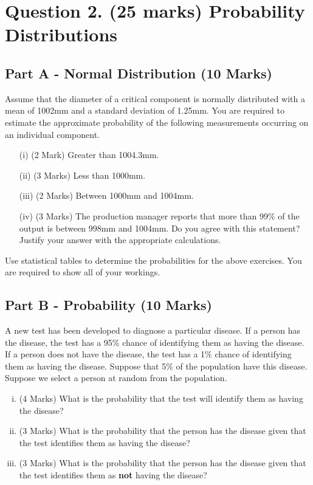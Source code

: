 \documentclass[a4paper,12pt]{article}
\begin{document}
\section*{Question 2. (25 marks) Probability Distributions }




\subsection*{Part A - Normal Distribution (10 Marks)}

\smallskip	
\noindent Assume that the diameter of a critical component is normally distributed with a mean of 1002mm and a standard deviation of 1.25mm. You are required  to estimate the approximate probability of the following measurements occurring on an individual component.
\begin{itemize}
	\item[(i)](2 Mark) Greater than 1004.3mm.
	\item[(ii)](3 Marks) Less than 1000mm.
	\item [(iii)](2 Marks) Between 1000mm and 1004mm.
	\item[(iv)] (3 Marks) The production manager reports that more than 99\% of the output is between 998mm and 1004mm. Do you agree with this statement? Justify your answer with the appropriate calculations.
\end{itemize}
\medskip
\noindent Use statistical tables to determine the probabilities for the above exercises. You are required to show all of your workings.

\bigskip
\subsection*{Part B - Probability (10 Marks)} %
A new test has been developed to diagnose a particular disease. If a person has the disease, the test has a 95\% chance of identifying them as having the disease.
If a person does not have the disease, the test has a 1\% chance of identifying them as having the disease.  Suppose that 5\% of the population have this disease. Suppose we select a person at random from the population.


\begin{enumerate}[(i)]
	\item (4 Marks) What is the probability that the test will identify them as having the disease?
	
	\item (3 Marks) What is the probability that the person has the disease given that the test identifies them as having the disease?
	\item (3 Marks) What is the probability that the person has the disease given that the test identifies them as \textbf{not} having the disease?
\end{enumerate}
\end{document}

